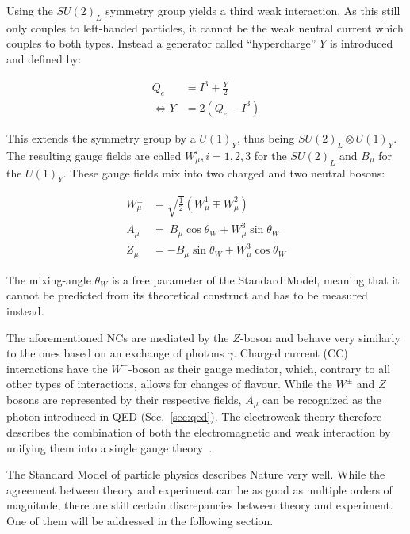 Using the $SU(2)_L$ symmetry group yields a third weak interaction. As this still only couples to left-handed particles, it cannot be the weak neutral current which couples to both types. Instead a generator called ``hypercharge'' $Y$ is introduced and defined by:

\begin{align}
  \label{eq:hypercharge}
                  Q_e &= I^3 + \frac{Y}{2} \\
  \Leftrightarrow Y   &= 2 \left( Q_e - I^3 \right)
\end{align}

\noindent This extends the symmetry group by a $U(1)_Y$, thus being $SU(2)_L \otimes U(1)_Y$. The resulting gauge fields are called $W^i_\mu, i = 1,2,3$ for the $SU(2)_L$ and $B_\mu$ for the $U(1)_Y$. These gauge fields mix into two charged and two neutral bosons:

\begin{align}
  \label{eq:ewbosons}
  W^\pm_\mu & = \sqrt{\frac{1}{2}} \left( W^1_\mu \mp W^2_\mu \right) \\
  A_\mu & = \ B_\mu \cos{\theta_W} + W^3_\mu \sin{\theta_W} \\
  Z_\mu & = - B_\mu \sin{\theta_W} + W^3_\mu \cos{\theta_W}
\end{align}
 
\noindent The mixing-angle $\theta_W$ is a free parameter of the Standard Model, meaning that it cannot be predicted from its theoretical construct and has to be measured instead.

The aforementioned NCs are mediated by the $Z$-boson and behave very similarly to the ones based on an exchange of photons $\gamma$. Charged current (CC) interactions have the $W^\pm$-boson as their gauge mediator, which, contrary to all other types of interactions, allows for changes of flavour. While the $W^\pm$ and $Z$ bosons are represented by their respective fields, $A_\mu$ can be recognized as the photon introduced in QED (Sec.~\ref{sec:qed}). The electroweak theory therefore describes the combination of both the electromagnetic and weak interaction by unifying them into a single gauge theory~\cite{standardmodel-salam,standardmodel-weinberg,standardmodel-glashow}.

The Standard Model of particle physics describes Nature very well. While the agreement between theory and experiment can be as good as multiple orders of magnitude, there are still certain discrepancies between theory and experiment. One of them will be addressed in the following section.

